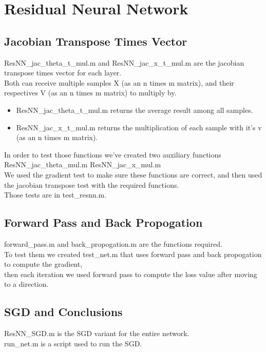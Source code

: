 \documentclass{article}
\numberwithin{equation}{section}
\begin{document}
\section{Residual Neural Network}
\subsection{Jacobian Transpose Times Vector}
ResNN{\_}jac{\_}theta{\_}t{\_}mul.m and ResNN{\_}jac{\_}x{\_}t{\_}mul.m are the jacobian transpose times vector for each layer.\\

Both can receive multiple samples X (as an n times m matrix), and their respectives V (as an n times m matrix) to multiply by.
\begin{itemize}
\item 
ResNN{\_}jac{\_}theta{\_}t{\_}mul.m returns the average result among all samples.
\item
ResNN{\_}jac{\_}x{\_}t{\_}mul.m returns the multiplication of each sample with it's v (as an n times m matrix).
\end{itemize}

In order to test those functions we've created two auxiliary functions ResNN{\_}jac{\_}theta{\_}mul.m ResNN{\_}jac{\_}x{\_}mul.m\\
We used the gradient test to make sure these functions are correct, and then used the jacobian transpose test with the required functions.\\
Those tests are in test{\_}resnn.m.

\subsection{Forward Pass and Back Propogation}
forward{\_}pass.m and back{\_}propogation.m are the functions required.\\

To test them we created test{\_}net.m that uses forward pass and back propogation to compute the gradient,\\
then each iteration we used forward pass to compute the loss value after moving to a direction.\\

\subsection{SGD and Conclusions}
ResNN{\_}SGD.m is the SGD variant for the entire network.\\
run{\_}net.m is a script used to run the SGD.\\
\end{document}
